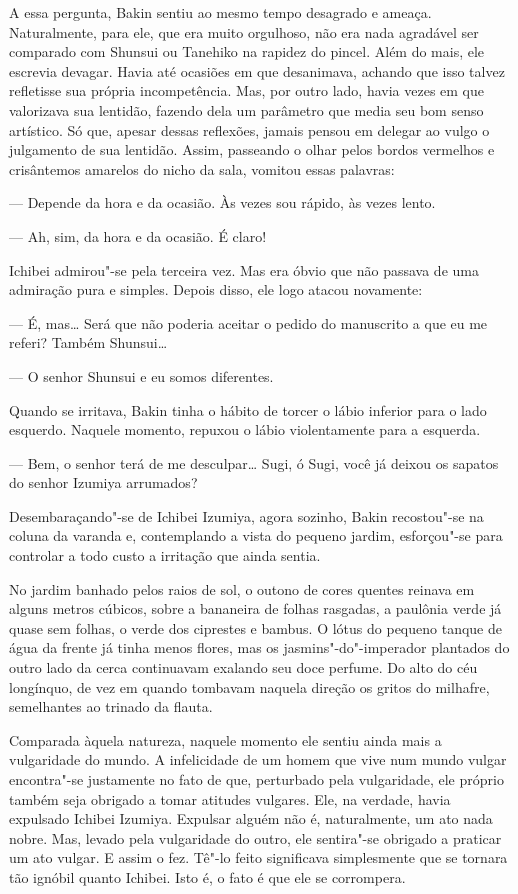 A essa pergunta, Bakin sentiu ao mesmo tempo desagrado e ameaça.
Naturalmente, para ele, que era muito orgulhoso, não era nada agradável
ser comparado com Shunsui ou Tanehiko na rapidez do pincel. Além do
mais, ele escrevia devagar. Havia até ocasiões em que desanimava,
achando que isso talvez refletisse sua própria incompetência. Mas, por
outro lado, havia vezes em que valorizava sua lentidão, fazendo dela um
parâmetro que media seu bom senso artístico. Só que, apesar dessas
reflexões, jamais pensou em delegar ao vulgo o julgamento de sua
lentidão. Assim, passeando o olhar pelos bordos vermelhos e crisântemos
amarelos do nicho da sala, vomitou essas palavras:

--- Depende da hora e da ocasião. Às vezes sou rápido, às vezes lento. 

--- Ah, sim, da hora e da ocasião. É claro!

Ichibei admirou"-se pela terceira vez. Mas era óbvio que não passava de
uma admiração pura e simples. Depois disso, ele logo atacou novamente:

--- É, mas\ldots{} Será que não poderia aceitar o pedido do manuscrito a que eu
me referi? Também Shunsui\ldots{}

--- O senhor Shunsui e eu somos diferentes.

Quando se irritava, Bakin tinha o hábito de torcer o lábio inferior para
o lado esquerdo. Naquele momento, repuxou o lábio violentamente para a
esquerda.

--- Bem, o senhor terá de me desculpar\ldots{} Sugi, ó Sugi, você já deixou
os sapatos do senhor Izumiya arrumados?

\sectionitem
Desembaraçando"-se de Ichibei Izumiya, agora sozinho, Bakin recostou"-se
na coluna da varanda e, contemplando a vista do pequeno jardim,
esforçou"-se para controlar a todo custo a irritação que ainda sentia.

No jardim banhado pelos raios de sol, o outono de cores quentes reinava
em alguns metros cúbicos, sobre a bananeira de folhas rasgadas, a
paulônia verde já quase sem folhas, o verde dos ciprestes e bambus. O
lótus do pequeno tanque de água da frente já tinha menos flores, mas os
jasmins"-do"-imperador plantados do outro lado da cerca continuavam
exalando seu doce perfume. Do alto do céu longínquo, de vez em quando
tombavam naquela direção os gritos do milhafre, semelhantes ao trinado
da flauta.

Comparada àquela natureza, naquele momento ele sentiu ainda mais a 
vulgaridade do mundo. A infelicidade de um homem que vive num mundo
vulgar encontra"-se justamente no fato de que, perturbado pela
vulgaridade, ele próprio também seja obrigado a tomar atitudes
vulgares. Ele, na verdade, havia expulsado Ichibei Izumiya. Expulsar
alguém não é, naturalmente, um ato nada nobre. Mas, levado pela
vulgaridade do outro, ele sentira"-se obrigado a praticar um ato vulgar.
E assim o fez. Tê"-lo feito significava simplesmente que se tornara tão
ignóbil quanto Ichibei. Isto é, o fato é que ele se corrompera.

